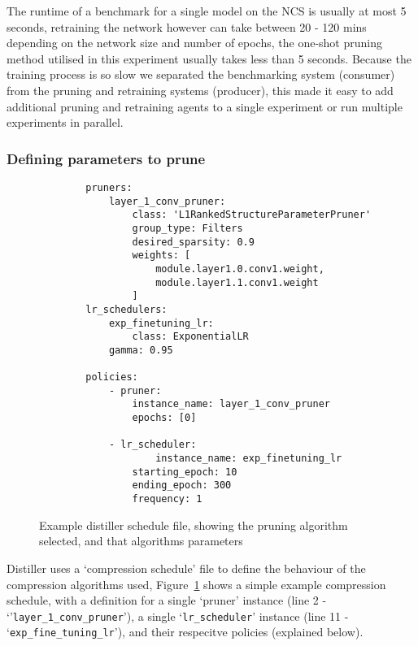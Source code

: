 \documentclass[../Dissertation.tex]{subfiles}
\begin{document}
The runtime of a benchmark for a single model on the NCS is usually at most 5 seconds, retraining the network however can take between 20 - 120 mins depending on the network size and number of epochs, the one-shot pruning method utilised in this experiment usually takes less than 5 seconds. 
Because the training process is so slow we separated the benchmarking system (consumer) from the pruning and retraining systems (producer), this made it easy to add additional pruning and retraining agents to a single experiment or run multiple experiments in parallel.

\subsubsection{Defining parameters to prune}\label{sec:paramDef}

\singlespacing
\begin{figure}[H]
    \begin{verbatim}
        pruners: 
            layer_1_conv_pruner:
                class: 'L1RankedStructureParameterPruner'
                group_type: Filters
                desired_sparsity: 0.9
                weights: [
                    module.layer1.0.conv1.weight,
                    module.layer1.1.conv1.weight
                ]
        lr_schedulers:
            exp_finetuning_lr:
                class: ExponentialLR
            gamma: 0.95

        policies:
            - pruner:
                instance_name: layer_1_conv_pruner
                epochs: [0]
            
            - lr_scheduler:
                    instance_name: exp_finetuning_lr
                starting_epoch: 10
                ending_epoch: 300
                frequency: 1
    \end{verbatim}
    \caption{Example distiller schedule file, showing the pruning algorithm selected, and that algorithms parameters}
    \label{fig:CompressionSchedule}
\end{figure}
\doublespacing

Distiller uses a `compression schedule' file to define the behaviour of the compression algorithms used, Figure~\ref{fig:CompressionSchedule} shows a simple example compression schedule, with a definition for a single `pruner' instance (line 2 - `'\texttt{\color{mintedgreen}layer\_1\_conv\_pruner}'), a single `\texttt{\color{mintedgreen}lr\_scheduler}' instance (line 11 - `\texttt{\color{mintedgreen}exp\_fine\_tuning\_lr}'), and their respecitve policies (explained below).
\end{document}
